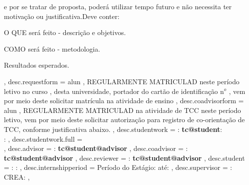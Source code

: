 {{                                e por se tratar de proposta, poderá utilizar  tempo futuro e não necessita ter motivação ou justificativa.\break  Deve conter:
                                \begin{enumerate*}[alpha)] 
                                	\item O QUE será feito - descrição e objetivos.
                                   \item COMO será feito - metodologia.
                                	\item Resultados esperados.
                                \end{enumerate*}%
                                } ,   %
  desc.requestform          = {  alun , 
                              REGULARMENTE MATRICULAD neste período letivo no curso \emph{}, desta universidade, 
                              portador do cartão de identificação n$^o$ , 
                              vem por meio deste solicitar matrícula na atividade de ensino} ,
  desc.coadvisorform            = { alun , 
                              REGULARMENTE MATRICULAD na atividade de TCC neste período letivo, 
                              vem por meio deste solicitar autorização para registro de co-orientação de TCC, conforme justificativa abaixo.} ,
  desc.studentwork          = {
                              \noindent{}: {\bf \csname tc@student\endcsname}\hfill {}: {\bf {}}\\%
                              \noindent{}: } ,
  desc.studentwork.full     = {\\[2.5mm]} ,  
  desc.advisor              = {\noindent{}:  \textbf{\csname tc@student@advisor\endcsname}} ,
  desc.coadvisor            = {\noindent{}:  \textbf{\csname tc@student@advisor\endcsname}} ,
  desc.reviewer             = {\noindent{}:  \textbf{\csname tc@student@advisor\endcsname}} ,
  desc.student              = {\noindent{}: {\bf {}}\hfill 
                              : {\bf {}}} ,
  desc.internshipperiod     = {\noindent Período do Estágio: {\bf {}} até: {\bf {}}} ,
  desc.supervisor           = {: \textbf{} \hfill CREA: \textbf{}} ,
}

